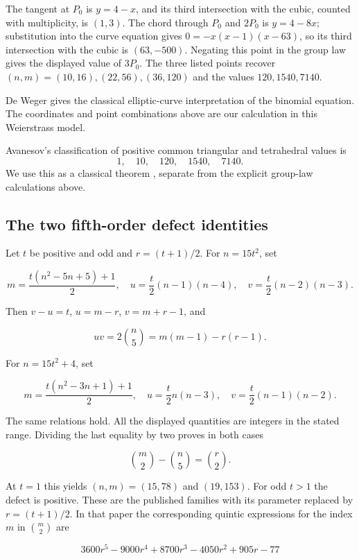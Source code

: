 \documentclass[11pt,a4paper]{article}
\begin{document}
The tangent at \(P_0\) is \(y=4-x\), and its third intersection with the cubic, counted with multiplicity, is \((1,3)\). The chord through \(P_0\) and \(2P_0\) is \(y=4-8x\); substitution into the curve equation gives \(0=-x(x-1)(x-63)\), so its third intersection with the cubic is \((63,-500)\). Negating this point in the group law gives the displayed value of \(3P_0\). The three listed points recover \((n,m)=(10,16),(22,56),(36,120)\) and the values \(120,1540,7140\).

De Weger \citep[Section 3, p. 377]{deWeger1997} gives the classical elliptic-curve interpretation of the binomial equation. The coordinates and point combinations above are our calculation in this Weierstrass model.

Avanesov's classification of positive common triangular and tetrahedral values is
\[
1,\quad10,\quad120,\quad1540,\quad7140.
\]
We use this as a classical theorem \citep{Avanesov1967}, separate from the explicit group-law calculations above.

\subsection{The two fifth-order defect identities}\label{subsec:E2}

Let \(t\) be positive and odd and \(r=(t+1)/2\). For \(n=15t^2\), set

\[
m=\frac{t(n^2-5n+5)+1}{2},\quad
u=\frac t2(n-1)(n-4),\quad
v=\frac t2(n-2)(n-3).
\]

Then \(v-u=t\), \(u=m-r\), \(v=m+r-1\), and

\[
uv=2\binom n5=m(m-1)-r(r-1).
\]

For \(n=15t^2+4\), set

\[
m=\frac{t(n^2-3n+1)+1}{2},\quad
u=\frac t2n(n-3),\quad
v=\frac t2(n-1)(n-2).
\]

The same relations hold. All the displayed quantities are integers in the stated range. Dividing the last equality by two proves in both cases

\[
\binom m2-\binom n5=\binom r2.
\]

At \(t=1\) this yields \((n,m)=(15,78)\) and \((19,153)\). For odd \(t>1\) the defect is positive. These are the published families \citep[Section 3.2, (3)--(4)]{BlokhuisBrouwerdeWeger2017} with its parameter replaced by \(r=(t+1)/2\). In that paper the corresponding quintic expressions for the index \(m\) in \(\binom m2\) are

\[
3600r^5-9000r^4+8700r^3-4050r^2+905r-77
\]
\end{document}
